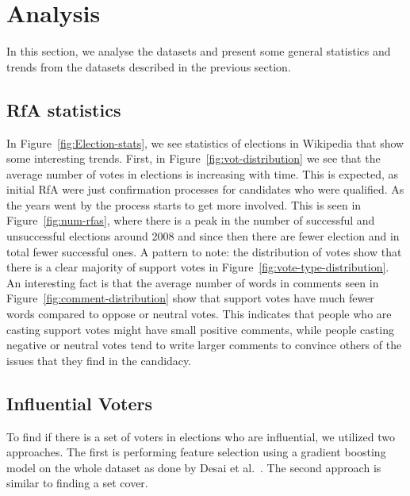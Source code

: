 \section{Analysis}
In this section, we analyse the datasets and present some general statistics and trends from the datasets described in the previous section.

\subsection{RfA statistics}
In Figure~\ref{fig:Election-stats}, we see statistics of elections in Wikipedia that show some interesting trends. First, in Figure~\ref{fig:vot-distribution} we see that the average number of votes in elections is increasing with time. This is expected, as initial RfA were just confirmation processes for candidates who were qualified. As the years went by the process starts to get more involved. This is seen in Figure~\ref{fig:num-rfas}, where there is a peak in the number of successful and unsuccessful elections around 2008 and since then there are fewer election and in total fewer successful ones. A pattern to note: the distribution of votes show that there is a clear majority of support votes in Figure~\ref{fig:vote-type-distribution}. An interesting fact is that the average number of words in comments seen in Figure~\ref{fig:comment-distribution} show that support votes have much fewer words compared to oppose or neutral votes. This indicates that people who are casting support votes might have small positive comments, while people casting negative or neutral votes tend to write larger comments to convince others of the issues that they find in the candidacy.

\subsection{Influential Voters}
\label{sec:influential-voters}
To find if there is a set of voters in elections who are influential, we utilized two approaches. The first is performing feature selection using a gradient boosting model on the whole dataset as done by Desai et al.\ \cite{desai2014result}. The second approach is similar to finding a set cover.

